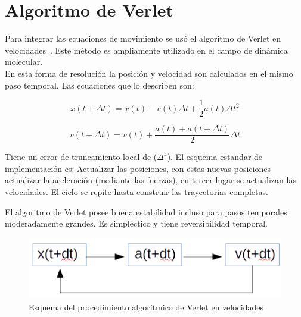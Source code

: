 \section{Algoritmo de Verlet}

Para integrar las ecuaciones de movimiento se usó el algoritmo de Verlet en velocidades~\cite{haile}. Este método es ampliamente utilizado en el campo de dinámica molecular.\\

En esta forma de resolución la posición y velocidad son calculados en el mismo paso temporal. Las ecuaciones que lo describen son:

\begin{equation}
x(t+\Delta t)=x(t)-v(t)\Delta t + \frac{1}{2}a(t)\Delta t^2 
\label{verlet_x}
\end{equation} 

\begin{equation}
v(t+\Delta t)=v(t)+\frac{a(t)+a(t+\Delta t)}{2}\Delta t
\label{verlet_v}
\end{equation}

Tiene un error de truncamiento local de ($\Delta^4$). El esquema estandar de implementación es: Actualizar las posiciones, con estas nuevas posiciones actualizar la aceleración (mediante las fuerzas), en tercer lugar se actualizan las velocidades. El ciclo se repite hasta construir las trayectorias completas. 



El algoritmo de Verlet posee buena estabilidad incluso para pasos temporales moderadamente grandes. Es simpléctico y tiene reversibilidad temporal.

\begin{figure}[H]
    \centering
        \includegraphics[scale=0.7]{figuras/esquema_verlet.png}
    \caption[width=5cm]{Esquema del procedimiento algorítmico de Verlet en velocidades}
    \label{esquema_verlet}
\end{figure}
